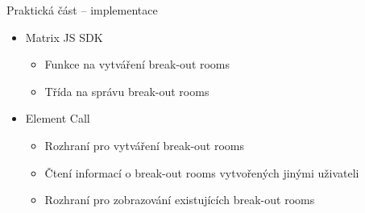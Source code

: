 \documentclass[aspectratio=169]{beamer}
\begin{document}
\begin{frame}{Praktická část -- implementace}
    \pause
    \begin{itemize}[<+->]
        \item Matrix JS SDK
              \begin{itemize}
                  \item Funkce na vytváření break-out rooms
                  \item Třída na správu break-out rooms
              \end{itemize}
        \item Element Call
              \begin{itemize}
                  \item Rozhraní pro vytváření break-out rooms
                  \item Čtení informací o break-out rooms vytvořených jinými uživateli
                  \item Rozhraní pro zobrazování existujících break-out rooms
              \end{itemize}
    \end{itemize}
\end{frame}
\end{document}
